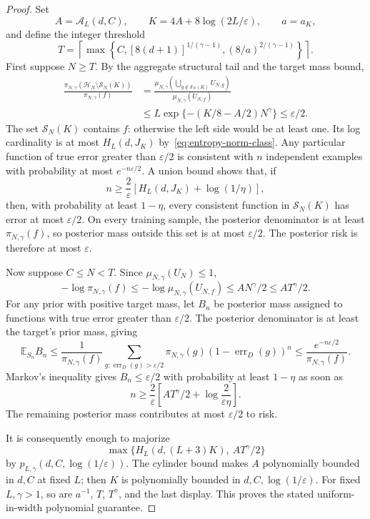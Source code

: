 \begin{proof}
Set
\[
 A=\mathcal A_L(d,C),\qquad K=4A+8\log(2L/\varepsilon),
 \qquad a=a_K,
\]
and define the integer threshold
\[
 T=\left\lceil\max\left\{C,
 [8(d+1)]^{1/(\gamma-1)},
 (8/a)^{2/(\gamma-1)}\right\}\right\rceil.
\]
First suppose $N\geq T$. By the aggregate structural tail and the target
mass bound,
\begin{align*}
 \frac{\pi_{N,\gamma}(\mathcal H_N\setminus\mathcal S_N(K))}
 {\pi_{N,\gamma}(f)}
 &=\frac{\mu_{N,\gamma}(\bigcup_{g\notin\mathcal S_N(K)}U_{N,g})}
 {\mu_{N,\gamma}(U_{N,f})}\\
 &\leq L\exp\{-(K/8-A/2)N^\gamma\}\leq\varepsilon/2.
\end{align*}
The set $\mathcal S_N(K)$ contains $f$: otherwise the left side would be
at least one. Its log cardinality is at most
$H_L(d,J_K)$ by~\eqref{eq:entropy-norm-class}.
Any particular function of true error greater than $\varepsilon/2$ is
consistent with $n$ independent examples with probability at most
$e^{-n\varepsilon/2}$. A union bound shows that, if
\[
 n\geq\frac2\varepsilon
 \left[H_L(d,J_K)+\log(1/\eta)\right],
\]
then, with probability at least $1-\eta$, every consistent function in
$\mathcal S_N(K)$ has error at most $\varepsilon/2$.
On every training sample, the posterior denominator is at least
$\pi_{N,\gamma}(f)$, so posterior mass outside this set is at most
$\varepsilon/2$. The posterior risk is therefore at most $\varepsilon$.

Now suppose $C\leq N<T$. Since $\mu_{N,\gamma}(U_N)\leq1$,
\[
 -\log\pi_{N,\gamma}(f)
 \leq-\log\mu_{N,\gamma}(U_{N,f})
 \leq AN^\gamma/2\leq AT^\gamma/2.
\]
For any prior with positive target mass, let $B_n$ be posterior mass assigned
to functions with true error greater than $\varepsilon/2$. The posterior
denominator is at least the target's prior mass, giving
\[
 \mathbb E_{S_n}B_n
 \leq\frac{1}{\pi_{N,\gamma}(f)}
 \sum_{g:\operatorname{err}_D(g)>\varepsilon/2}
 \pi_{N,\gamma}(g)(1-\operatorname{err}_D(g))^n
 \leq\frac{e^{-n\varepsilon/2}}{\pi_{N,\gamma}(f)}.
\]
Markov's inequality gives $B_n\leq\varepsilon/2$ with probability at least
$1-\eta$ as soon as
\[
 n\geq\frac2\varepsilon\left[AT^\gamma/2+
 \log\frac{2}{\varepsilon\eta}\right].
\]
The remaining posterior mass contributes at most $\varepsilon/2$ to risk.

It is consequently enough to majorize
\[
 \max\{H_L(d,(L+3)K),\ AT^\gamma/2\}
\]
by $p_{L,\gamma}(d,C,\log(1/\varepsilon))$.
The cylinder bound makes $A$ polynomially bounded in $d,C$ at fixed $L$;
then $K$ is polynomially bounded in $d,C,\log(1/\varepsilon)$.
For fixed $L,\gamma>1$, so are $a^{-1}$, $T$, $T^\gamma$, and the last
display. This proves the stated uniform-in-width polynomial guarantee.
\end{proof}

